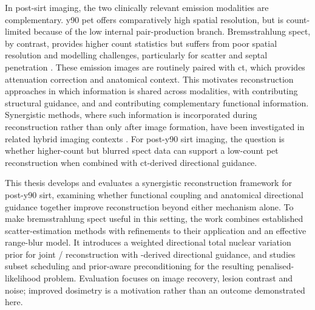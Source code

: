 In post-\gls{sirt} imaging, the two clinically relevant emission modalities are complementary. \gls{y90} \acrfull{pet} offers comparatively high spatial resolution, but is count-limited because of the low internal pair-production branch. Bremsstrahlung \acrfull{spect}, by contrast, provides higher count statistics but suffers from poor spatial resolution and modelling challenges, particularly for scatter and septal penetration \cite{kappadathQuantitativeEvaluation90YPET2024}. These emission images are routinely paired with \acrfull{ct}, which provides attenuation correction and anatomical context. This motivates reconstruction approaches in which information is shared across modalities, with  contributing structural guidance, and  and  contributing complementary functional information. Synergistic methods, where such information is incorporated during reconstruction rather than only after image formation, have been investigated in related hybrid imaging contexts \cite{arridgeOverviewSynergisticReconstruction2021}. For post-\gls{y90} \gls{sirt} imaging, the question is whether higher-count but blurred \gls{spect} data can support a low-count \gls{pet} reconstruction when combined with \gls{ct}-derived directional guidance.

This thesis develops and evaluates a synergistic reconstruction framework for post-\gls{y90} \gls{sirt}, examining whether functional coupling and anatomical directional guidance together improve reconstruction beyond either mechanism alone. To make bremsstrahlung \gls{spect} useful in this setting, the work combines established scatter-estimation methods with refinements to their application and an effective range-blur model. It introduces a weighted directional total nuclear variation prior for joint / reconstruction with -derived directional guidance, and studies subset scheduling and prior-aware preconditioning for the resulting penalised-likelihood problem. Evaluation focuses on image recovery, lesion contrast and noise; improved dosimetry is a motivation rather than an outcome demonstrated here.

